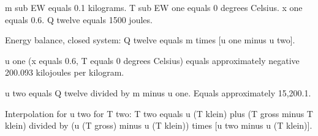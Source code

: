 m sub EW equals 0.1 kilograms.  
T sub EW one equals 0 degrees Celsius.  
x one equals 0.6.  
Q twelve equals 1500 joules.  

Energy balance, closed system:  
Q twelve equals m times [u one minus u two].  

u one (x equals 0.6, T equals 0 degrees Celsius) equals approximately negative 200.093 kilojoules per kilogram.  

u two equals Q twelve divided by m minus u one.  
Equals approximately 15,200.1.  

Interpolation for u two for T two:  
T two equals u (T klein) plus (T gross minus T klein) divided by (u (T gross) minus u (T klein)) times [u two minus u (T klein)].